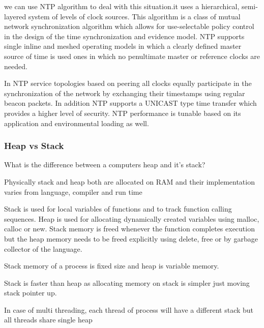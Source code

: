 we can use NTP algorithm to deal with this situation.it uses a hierarchical, semi-layered system of levels of clock sources. 
This algorithm is a class of mutual network synchronization algorithm which allows for use-selectable policy control in the design of the time synchronization and evidence model. 
NTP supports single inline and meshed operating models in which a clearly defined master source of time is used ones in which no penultimate master or reference clocks are needed. 

In NTP service topologies based on peering all clocks equally participate in the synchronization of the network by exchanging their timestamps using regular beacon packets. In 
addition NTP supports a UNICAST type time transfer which provides a higher level of security. NTP performance is tunable based on its application and environmental loading as well.

\subsubsection{Heap vs Stack}
What is the difference between a computers heap and it's stack?

Physically stack and heap both are allocated on RAM and their implementation varies from language, compiler and run time 

Stack is used for local variables of functions and to track function calling sequences. Heap is used for allocating dynamically created variables using malloc, calloc or new. 
Stack memory is freed whenever the function completes execution but the heap memory needs to be freed explicitly using delete, free or by garbage collector of the language. 

Stack memory of a process is fixed size and heap is variable memory. 

Stack is faster than heap as allocating memory on stack is simpler just moving stack pointer up. 

In case of multi threading, each thread of process will have a different stack but all threads share single heap
